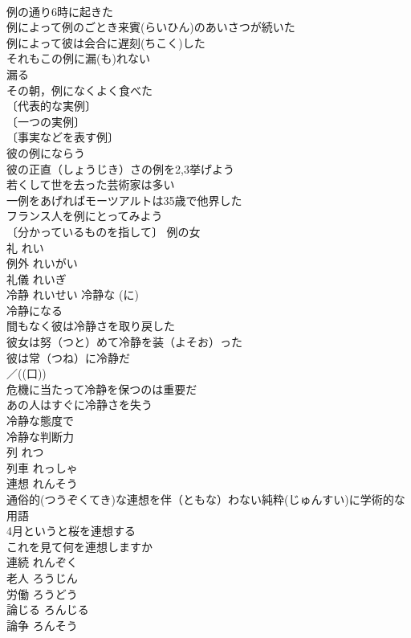 \documentclass[8pt]{extreport}
\begin{document}
\begin{CJK}{UTF8}{min}
\\	例の通り6時に起きた 
\\	例によって例のごとき来賓(らいひん)のあいさつが続いた 
\\	例によって彼は会合に遅刻(ちこく)した 
\\	それもこの例に漏(も)れない 
\\	漏る　
\\	その朝，例になくよく食べた 
\\	〔代表的な実例〕
\\	〔一つの実例〕
\\	〔事実などを表す例〕
\\	彼の例にならう 
\\	彼の正直（しょうじき）さの例を2,3挙げよう 
\\	若くして世を去った芸術家は多い
\\	一例をあげればモーツアルトは35歳で他界した 
\\	フランス人を例にとってみよう 
\\	〔分かっているものを指して〕 例の女 
\\	礼	れい	
\\	例外	れいがい	
\\	礼儀	れいぎ	
\\	冷静	れいせい	冷静な (に) 
\\	冷静になる 
\\	間もなく彼は冷静さを取り戻した 
\\	彼女は努（つと）めて冷静を装（よそお）った 
\\	彼は常（つね）に冷静だ 
\\	／((口)) 
\\	危機に当たって冷静を保つのは重要だ 
\\	あの人はすぐに冷静さを失う 
\\	冷静な態度で 
\\	冷静な判断力 
\\	列	れつ	
\\	列車	れっしゃ	
\\	連想	れんそう	
\\	通俗的(つうぞくてき)な連想を伴（ともな）わない純粋(じゅんすい)に学術的な用語 
\\	4月というと桜を連想する 
\\	これを見て何を連想しますか 
\\	連続	れんぞく	
\\	老人	ろうじん	
\\	労働	ろうどう	
\\	論じる	ろんじる	
\\	論争	ろんそう	

\end{CJK}
\end{document}
